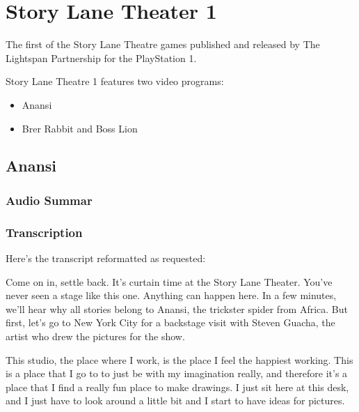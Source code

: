 \chapter{Story Lane Theater 1}


The first of the Story Lane Theatre games published and released by The Lightspan Partnership for the PlayStation 1.

Story Lane Theatre 1 features two video programs:

\begin{itemize}
    \item Anansi
    \item Brer Rabbit and Boss Lion
\end{itemize}

\clearpage
\newpage

\section{Anansi}

\subsection{Audio Summar}

\subsection{Transcription}

Here's the transcript reformatted as requested:

Come on in, settle back. It's curtain time at the Story Lane Theater. You've never seen a stage like this one. Anything can happen here. In a few minutes, we'll hear why all stories belong to Anansi, the trickster spider from Africa. But first, let's go to New York City for a backstage visit with Steven Guacha, the artist who drew the pictures for the show.

This studio, the place where I work, is the place I feel the happiest working. This is a place that I go to to just be with my imagination really, and therefore it's a place that I find a really fun place to make drawings. I just sit here at this desk, and I just have to look around a little bit and I start to have ideas for pictures.

